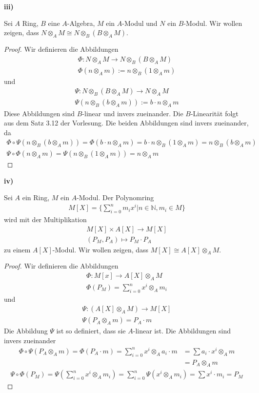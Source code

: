 \documentclass{article}
\theoremstyle{definition}
\theoremstyle{plain}
\theoremstyle{remark}
\newcommand{\teilaufgabe}[1]{
	{
		\vspace*{0.2cm}
		\textsf{\textbf{#1)}}
	}
}
\begin{document}
\teilaufgabe{iii}
Sei $A$ Ring, $B$ eine $A$-Algebra, $M$ ein $A$-Modul und $N$ ein $B$-Modul. Wir wollen zeigen, dass $N\otimes_A M\cong N\otimes_B(B\otimes_AM)$.
\begin{proof}
	Wir definieren die Abbildungen
	\begin{align}
		\Phi:N\otimes_A M\to N\otimes_B(B\otimes_A M) \\
		\Phi(n\otimes_A m):=n\otimes_B(1\otimes_Am)
	\end{align}
und 
\begin{align}
	\Psi:N\otimes_B(B\otimes_A M)\to N\otimes_A M\\
	\Psi(n\otimes_B(b\otimes_Am)):=b\cdot n \otimes_A m
\end{align}
Diese Abbildungen sind $B$-linear und invers zueinander. Die $B$-Linearität folgt aus dem Satz 3.12 der Vorlesung. Die beiden Abbildungen sind invers zueinander, da
\begin{align}
	\Phi\circ\Psi(n\otimes_B(b\otimes_Am))=\Phi(b\cdot n\otimes_Am)=b\cdot n\otimes_B(1\otimes_A m) =n\otimes_B(b\otimes_Am) \\
	\Psi\circ\Phi(n\otimes_A m)=\Psi(n\otimes_B(1\otimes_A m))=n\otimes_A m
\end{align}
\end{proof}
\teilaufgabe{iv}
Sei $A$ ein Ring, $M$ ein $A$-Modul. Der Polynomring 
\begin{align}
	M[X]=\{\sum_{i=0}^nm_ix^i|n\in\mathbb{N},m_i\in M\}
\end{align}
wird mit der Multiplikation
\begin{align}
	M[X]\times A[X]\to M[X] \\
	(P_M,P_A)\mapsto P_M\cdot P_A
\end{align}
zu einem $A[X]$-Modul.
Wir wollen zeigen, dass $M[X]\cong A[X]\otimes_A M$.
\begin{proof}
	Wir definieren die Abbildungen
	\begin{align}
		\Phi:M[x]\to A[X]\otimes_A M \\
		\Phi(P_M)=\sum_{i=0}^n x^i\otimes_A m_i
	\end{align}
	 und 
	 \begin{align}
		 \Psi:(A[X]\otimes_A M)\to M[X] \\
		 \Psi(P_A\otimes_A m)=P_A\cdot m
	 \end{align}
	 Die Abbildung $\Psi$ ist so definiert, dass sie $A$-linear ist.
	Die Abbildungen sind invers zueinander
	\begin{align}
		\Phi\circ\Psi(P_A\otimes_A m)=\Phi(P_A\cdot m)=\sum_{i=0}^n x^i\otimes_A a_i\cdot m &=\sum a_i\cdot x^i\otimes_A m \\
		&= P_A\otimes_A m
	\end{align}
	\begin{align}
		\Psi\circ\Phi(P_M)=\Psi(\sum_{i=0}^n x^i\otimes_A m_i)=\sum_{i=0}^n \Psi(x^i\otimes_A m_i)=\sum x^i\cdot m_i=P_M
	\end{align}
\end{proof}
\end{document}
